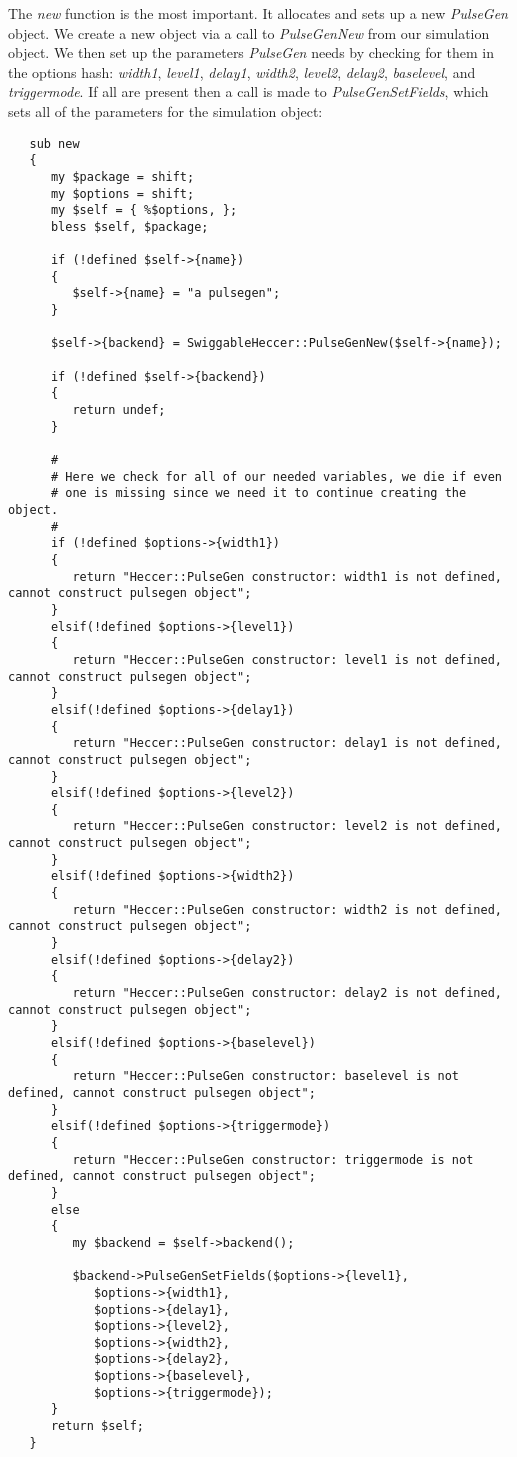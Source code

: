 \documentclass[12pt]{article}
\begin{document}
The {\it new} function is the most important. It allocates and sets up a new {\it PulseGen} object. We create a new object via a call to {\it PulseGenNew} from our simulation object. We then set up the parameters {\it PulseGen} needs by checking for them in the options hash: {\it width1}, {\it level1}, {\it delay1}, {\it width2}, {\it level2}, {\it delay2}, {\it baselevel}, and {\it triggermode}. If all are present then a call is made to {\it PulseGenSetFields}, which sets all of the parameters for the simulation object:
\begin{verbatim}
   sub new
   {
      my $package = shift;
      my $options = shift;
      my $self = { %$options, };
      bless $self, $package;

      if (!defined $self->{name})
      {
         $self->{name} = "a pulsegen";
      }

      $self->{backend} = SwiggableHeccer::PulseGenNew($self->{name});

      if (!defined $self->{backend})
      {
         return undef;
      }

      #
      # Here we check for all of our needed variables, we die if even 
      # one is missing since we need it to continue creating the object.
      #
      if (!defined $options->{width1})
      {   
         return "Heccer::PulseGen constructor: width1 is not defined, cannot construct pulsegen object";
      }
      elsif(!defined $options->{level1})
      {
         return "Heccer::PulseGen constructor: level1 is not defined, cannot construct pulsegen object";
      }
      elsif(!defined $options->{delay1})
      {
         return "Heccer::PulseGen constructor: delay1 is not defined, cannot construct pulsegen object";
      }
      elsif(!defined $options->{level2})
      {
         return "Heccer::PulseGen constructor: level2 is not defined, cannot construct pulsegen object";
      }
      elsif(!defined $options->{width2})
      {
         return "Heccer::PulseGen constructor: width2 is not defined, cannot construct pulsegen object";
      }
      elsif(!defined $options->{delay2})
      {
         return "Heccer::PulseGen constructor: delay2 is not defined, cannot construct pulsegen object";
      }
      elsif(!defined $options->{baselevel})
      {
         return "Heccer::PulseGen constructor: baselevel is not defined, cannot construct pulsegen object";
      }
      elsif(!defined $options->{triggermode})
      {
         return "Heccer::PulseGen constructor: triggermode is not defined, cannot construct pulsegen object";
      }
      else
      {
         my $backend = $self->backend();

         $backend->PulseGenSetFields($options->{level1},
            $options->{width1},
            $options->{delay1},
            $options->{level2},
            $options->{width2},
            $options->{delay2},
            $options->{baselevel},
            $options->{triggermode});
      }
      return $self;
   }
\end{verbatim}
\end{document}
